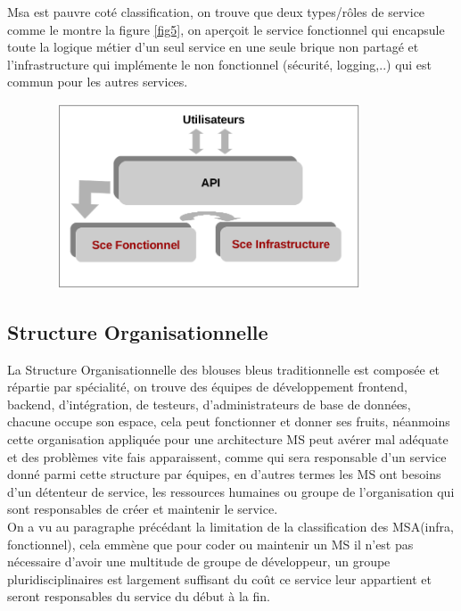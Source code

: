 \documentclass[12pt, a4paper, openany]{report}
\begin{document}
   Msa est pauvre coté classification, on trouve que deux types/rôles de service comme le montre la figure \ref{fig5}, on aperçoit le service fonctionnel qui encapsule toute la logique métier d'un seul service en une seule brique non partagé et l'infrastructure qui implémente le non fonctionnel (sécurité, logging,..) qui est commun pour les autres services.

   \begin{center}
     \includegraphics[width=12cm, height=5.5cm]{classif_msa_5.png}
     \label{fig5}
   \end{center}
   
  
  \subsection{Structure Organisationnelle} %
   
   La Structure Organisationnelle des blouses bleus traditionnelle est composée et répartie par spécialité, on trouve des équipes de développement frontend, backend, d'intégration, de testeurs, d'administrateurs de base de données, chacune occupe son espace, cela peut fonctionner et donner ses fruits, néanmoins cette organisation appliquée pour une architecture MS peut avérer mal adéquate et des problèmes vite fais apparaissent, comme qui sera responsable d'un service donné parmi cette structure par équipes, en d'autres termes les MS ont besoins d'un détenteur de service, les ressources humaines ou groupe de l’organisation qui sont responsables de créer et maintenir le service.\\
   
   On a vu au paragraphe précédant la limitation de la classification des MSA(infra, fonctionnel), cela emmène que pour coder ou maintenir un MS il n'est pas nécessaire d'avoir une multitude de groupe de développeur, un groupe pluridisciplinaires est largement suffisant du coût ce service leur appartient et seront responsables du service du début à la fin.
   
\end{document}
